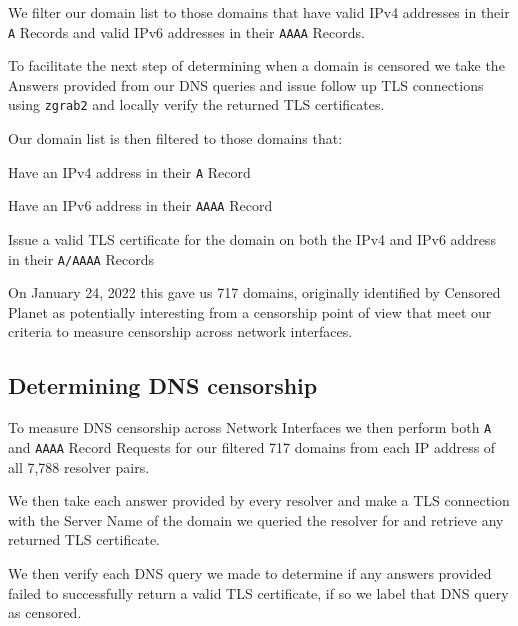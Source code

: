 We filter our domain list to those domains that have valid IPv4 addresses in
their \texttt{A} Records and valid IPv6 addresses in their \texttt{AAAA}
Records.

To facilitate the next step of determining when a domain is censored we take the
Answers provided from our DNS queries and issue follow up TLS connections using
\texttt{zgrab2} and locally verify the returned TLS certificates.

Our domain list is then filtered to those domains that:
\begin{packed_enumerate}
    \item Have an IPv4 address in their \texttt{A} Record
    \item Have an IPv6 address in their \texttt{AAAA} Record
    \item Issue a valid TLS certificate for the domain on both the IPv4 and IPv6
    address in their \texttt{A/AAAA} Records
\end{packed_enumerate}

On January 24, 2022 this gave us 717 domains, originally identified by Censored
Planet as potentially interesting from a censorship point of view that meet our
criteria to measure censorship across network interfaces.

\subsection{Determining DNS censorship}\label{ssec:determining-censorship}

To measure DNS censorship across Network Interfaces we then perform both
\texttt{A} and \texttt{AAAA} Record Requests for our filtered 717 domains from
each IP address of all 7,788 resolver pairs.

We then take each answer provided by every resolver and make a TLS connection
with the Server Name of the domain we queried the resolver for and retrieve any
returned TLS certificate.

We then verify each DNS query we made to determine if any answers provided
failed to successfully return a valid TLS certificate, if so we label that DNS
query as censored.